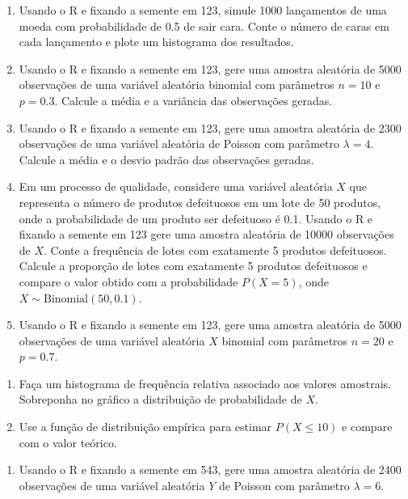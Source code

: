 \documentclass[
]{book}
\providecommand{\tightlist}{%
  \setlength{\itemsep}{0pt}\setlength{\parskip}{0pt}}
\begin{document}
\begin{enumerate}
\def\labelenumi{\arabic{enumi}.}
\item
  Usando o R e fixando a semente em 123, simule 1000 lançamentos de uma moeda com probabilidade de 0.5 de sair cara. Conte o número de caras em cada lançamento e plote um histograma dos resultados.
\item
  Usando o R e fixando a semente em 123, gere uma amostra aleatória de 5000 observações de uma variável aleatória binomial com parâmetros \(n = 10\) e \(p = 0.3\). Calcule a média e a variância das observações geradas.
\item
  Usando o R e fixando a semente em 123, gere uma amostra aleatória de 2300 observações de uma variável aleatória de Poisson com parâmetro \(\lambda = 4\). Calcule a média e o desvio padrão das observações geradas.
\item
  Em um processo de qualidade, considere uma variável aleatória \(X\) que representa o número de produtos defeituosos em um lote de 50 produtos, onde a probabilidade de um produto ser defeituoso é 0.1. Usando o R e fixando a semente em 123 gere uma amostra aleatória de 10000 observações de \(X\). Conte a frequência de lotes com exatamente 5 produtos defeituosos. Calcule a proporção de lotes com exatamente 5 produtos defeituosos e compare o valor obtido com a probabilidade \(P(X=5)\), onde \(X \sim \text{Binomial}(50, 0.1)\).
\item
  Usando o R e fixando a semente em 123, gere uma amostra aleatória de 5000 observações de uma variável aleatória \(X\) binomial com parâmetros \(n = 20\) e \(p = 0.7\).
\end{enumerate}

\begin{enumerate}
\def\labelenumi{(\alph{enumi})}
\item
  Faça um histograma de frequência relativa associado aos valores amostrais. Sobreponha no gráfico a distribuição de probabilidade de \(X\).
\item
  Use a função de distribuição empírica para estimar \(P(X\leq 10)\) e compare com o valor teórico.
\end{enumerate}

\begin{enumerate}
\def\labelenumi{\arabic{enumi}.}
\setcounter{enumi}{5}
\tightlist
\item
  Usando o R e fixando a semente em 543, gere uma amostra aleatória de 2400 observações de uma variável aleatória \(Y\) de Poisson com parâmetro \(\lambda = 6\).
\end{enumerate}
\end{document}
